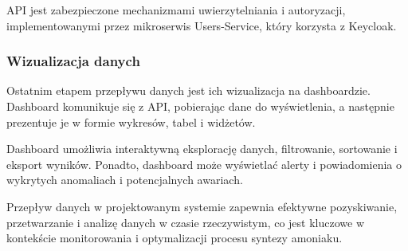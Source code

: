 API jest zabezpieczone mechanizmami uwierzytelniania i autoryzacji, implementowanymi przez mikroserwis Users-Service, który korzysta z Keycloak.

\subsubsection{Wizualizacja danych}
\label{subsubsec:wizualizacja_danych}

Ostatnim etapem przepływu danych jest ich wizualizacja na dashboardzie. Dashboard komunikuje się z API, pobierając dane do wyświetlenia, a następnie prezentuje je w formie wykresów, tabel i widżetów.

Dashboard umożliwia interaktywną eksplorację danych, filtrowanie, sortowanie i eksport wyników. Ponadto, dashboard może wyświetlać alerty i powiadomienia o wykrytych anomaliach i potencjalnych awariach.

Przepływ danych w projektowanym systemie zapewnia efektywne pozyskiwanie, przetwarzanie i analizę danych w czasie rzeczywistym, co jest kluczowe w kontekście monitorowania i optymalizacji procesu syntezy amoniaku. 